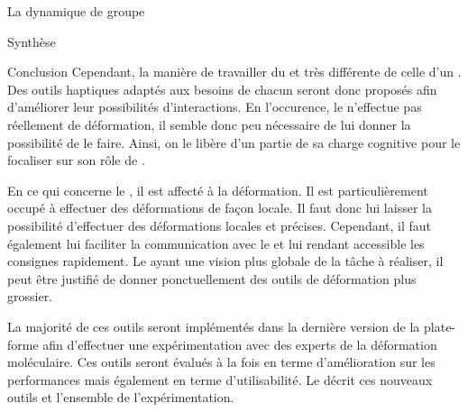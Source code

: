 \documentclass[myfrancais,ngerman,english,frenchb]{mythesis}
\begin{document}
\begin{mychapter}{La dynamique de groupe}
\begin{mysection}{Synthèse}
\begin{mysubsection}{Conclusion}
				Cependant, la manière de travailler du  et très différente de celle d'un .
				Des outils haptiques adaptés aux besoins de chacun seront donc proposés afin d'améliorer leur possibilités d'interactions.
				En l'occurence, le  n'effectue pas réellement de déformation, il semble donc peu nécessaire de lui donner la possibilité de le faire.
				Ainsi, on le libère d'un partie de sa charge cognitive pour le focaliser sur son rôle de .

				En ce qui concerne le , il est affecté à la déformation.
				Il est particulièrement occupé à effectuer des déformations de façon locale.
				Il faut donc lui laisser la possibilité d'effectuer des déformations locales et précises.
				Cependant, il faut également lui faciliter la communication avec le  et lui rendant accessible les consignes rapidement.
				Le  ayant une vision plus globale de la tâche à réaliser, il peut être justifié de donner ponctuellement des outils de déformation plus grossier.

				La majorité de ces outils seront implémentés dans la dernière version de la plate-forme afin d'effectuer une expérimentation avec des experts de la déformation moléculaire.
				Ces outils seront évalués à la fois en terme d'amélioration sur les performances mais également en terme d'utilisabilité.
				Le  décrit ces nouveaux outils et l'ensemble de l'expérimentation.
			\end{mysubsection}
		\end{mysection}
	\end{mychapter}
\end{document}
